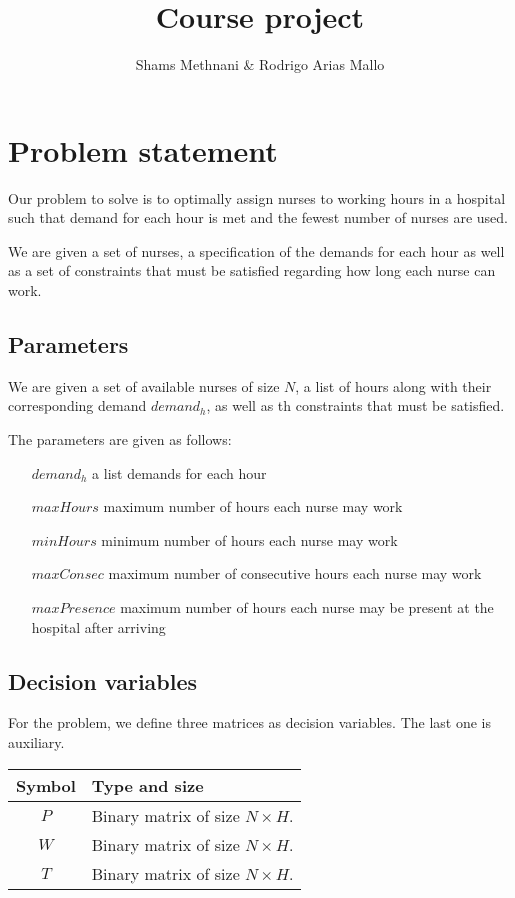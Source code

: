 \documentclass[12pt,a4paper]{article}
\title{Course project}
\author{Shams Methnani \& Rodrigo Arias Mallo}
\begin{document}
\maketitle

\section{Problem statement}


Our problem to solve is to optimally assign nurses to working hours in a hospital such that demand for each hour is met and the fewest number of nurses are used.

We are given a set of nurses, a specification of the demands for each hour as well as a set of constraints that must be satisfied regarding how long each nurse can work.

\subsection{Parameters}


We are given a set of available nurses of size $N$, a list of hours along with their corresponding demand ${demand}_h$, as well as th constraints that must be satisfied.

The parameters are given as follows:
    \begin{enumerate}
    \paragraph{}
        \item [${demand}_h$] a list demands for each hour
        \item [${maxHours}$] maximum number of hours each nurse may work
        \item [${minHours}$] minimum number of hours each nurse may work
        \item [${maxConsec}$] maximum number of consecutive hours each nurse may work
        \item [${maxPresence}$] maximum number of hours each nurse may be present at the hospital after arriving
    \end{enumerate}
%
\subsection{Decision variables}

For the problem, we define three matrices as decision variables. The last one is
auxiliary.
%
\begin{table}[h]
\centering
\begin{tabular}{c l}
\toprule
Symbol & Type and size \\
\midrule
$P$ & Binary matrix of size $N \times H$.\\
$W$ & Binary matrix of size $N \times H$.\\
$T$ & Binary matrix of size $N \times H$.\\
\bottomrule
\end{tabular}
\end{table}
\end{document}
